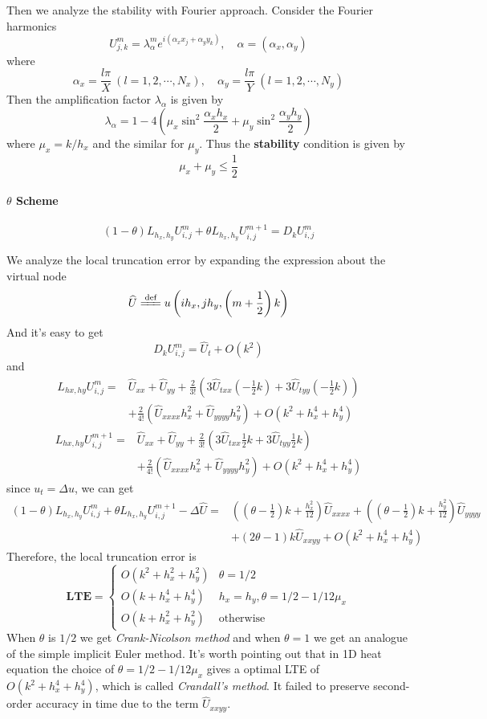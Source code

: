 \documentclass[12pt]{article}
\newcommand{\eqdef}{\xlongequal{\text{def}}}%
\begin{document}
Then we analyze the stability with Fourier approach. Consider the Fourier harmonics 
$$U_{j,k}^m =\lambda_{\alpha}^me^{i(\alpha_xx_j+\alpha_yy_k)},\quad \alpha = (\alpha_x, \alpha_y)$$
where
$$
\alpha_x = \frac{l\pi}{X}\ (l = 1,2,\cdots,N_x),\quad \alpha_y = \frac{l\pi}{Y}\ (l = 1,2,\cdots,N_y)
$$
Then the amplification factor $\lambda_\alpha$ is given by 
$$
\lambda_\alpha = 1 - 4\left(\mu_x\sin^2\frac{\alpha_xh_x}{2}+\mu_y\sin^2\frac{\alpha_yh_y}{2}\right)
$$
where $\mu_x = k/h_x$ and the similar for $\mu_y$. Thus the \textbf{stability} condition is given by
$$
\mu_x + \mu_y \le \frac{1}{2}
$$
\paragraph{$\theta$ Scheme}
$$
(1-\theta)L_{h_x,h_y}U_{i,j}^m+\theta L_{h_x,h_y}U_{i,j}^{m+1} = D_kU_{i,j}^m
$$

We analyze the local truncation error by expanding the expression about the virtual node 
$$\widehat{U} \eqdef u\left(ih_x,jh_y,\left(m+\frac{1}{2}\right)k\right)$$
And it's easy to get 
$$
D_kU_{i,j}^m = \widehat{U}_t + O(k^2)
$$
and
$$
\begin{aligned}
L_{hx,hy}U_{i,j}^m =& \widehat{U}_{xx} + \widehat{U}_{yy} + \frac{2}{3!}\left(3\widehat{U}_{txx}\left(-\frac{1}{2}k\right)+3\widehat{U}_{tyy}\left(-\frac{1}{2}k\right)\right) \\
&+\frac{2}{4!}\left(\widehat{U}_{xxxx}h_x^2+\widehat{U}_{yyyy}h_y^2\right)+O(k^2+h_x^4+h_y^4)
 \end{aligned}
$$
$$
\begin{aligned}
L_{hx,hy}U_{i,j}^{m+1} =& \widehat{U}_{xx} + \widehat{U}_{yy} + \frac{2}{3!}\left(3\widehat{U}_{txx}\frac{1}{2}k+3\widehat{U}_{tyy}\frac{1}{2}k\right) \\
&+\frac{2}{4!}\left(\widehat{U}_{xxxx}h_x^2+\widehat{U}_{yyyy}h_y^2\right)+O(k^2+h_x^4+h_y^4)
 \end{aligned}
$$
since $u_t=\Delta u$, we can get
$$
\begin{aligned}
(1-\theta)L_{h_x,h_y}U_{i,j}^m+\theta L_{h_x,h_y}U_{i,j}^{m+1} - \Delta \widehat{U} =& \left(\left(\theta - \frac{1}{2}\right)k+\frac{h_x^2}{12}\right)\widehat{U}_{xxxx}+\left(\left(\theta - \frac{1}{2}\right)k+\frac{h_y^2}{12}\right)\widehat{U}_{yyyy}\\
&+\left(2\theta - 1\right)k\widehat{U}_{xxyy} + O(k^2+h_x^4+h_y^4)
\end{aligned}
$$
Therefore, the local truncation error is 
$$
\textbf{LTE} = 
\begin{cases}
O(k^2+h_x^2+h_y^2) & \theta = 1/2\\
O(k+h_x^4+h_y^4) & h_x =h_y, \theta = 1/2 - 1/12\mu_x\\
O(k+h_x^2+h_y^2) & \text{otherwise}
\end{cases}
$$
When $\theta$ is $1/2$ we get \emph{Crank-Nicolson method} and when $\theta = 1$ we get an analogue of the simple implicit Euler method. It's worth pointing out that in 1D heat equation the choice of $\theta = 1/2 - 1/12\mu_x$ gives a optimal LTE of $O(k^2+h_x^4+h_y^4)$, which is called \emph{Crandall’s method}. It failed to preserve second-order accuracy in time due to the term $\widehat{U}_{xxyy}$.
\end{document}
